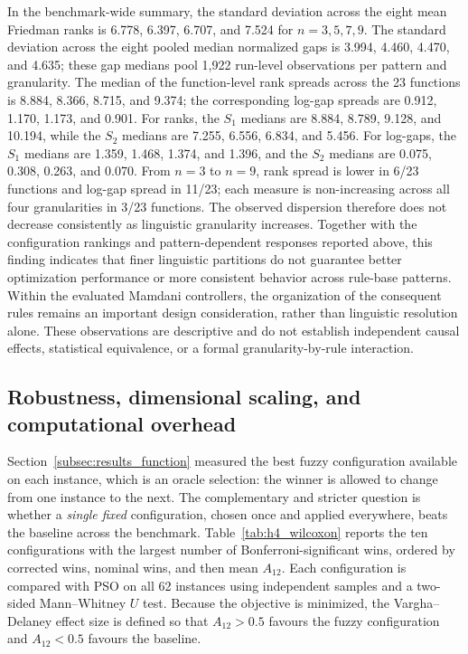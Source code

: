 In the benchmark-wide summary, the standard deviation across the eight mean Friedman ranks is 6.778, 6.397, 6.707, and 7.524 for $n=3,5,7,9$. The standard deviation across the eight pooled median normalized gaps is 3.994, 4.460, 4.470, and 4.635; these gap medians pool 1,922 run-level observations per pattern and granularity. The median of the function-level rank spreads across the 23 functions is 8.884, 8.366, 8.715, and 9.374; the corresponding log-gap spreads are 0.912, 1.170, 1.173, and 0.901. For ranks, the $S_1$ medians are 8.884, 8.789, 9.128, and 10.194, while the $S_2$ medians are 7.255, 6.556, 6.834, and 5.456. For log-gaps, the $S_1$ medians are 1.359, 1.468, 1.374, and 1.396, and the $S_2$ medians are 0.075, 0.308, 0.263, and 0.070. From $n=3$ to $n=9$, rank spread is lower in 6/23 functions and log-gap spread in 11/23; each measure is non-increasing across all four granularities in 3/23 functions. The observed dispersion therefore does not decrease consistently as linguistic granularity increases. Together with the configuration rankings and pattern-dependent responses reported above, this finding indicates that finer linguistic partitions do not guarantee better optimization performance or more consistent behavior across rule-base patterns. Within the evaluated Mamdani controllers, the organization of the consequent rules remains an important design consideration, rather than linguistic resolution alone. These observations are descriptive and do not establish independent causal effects, statistical equivalence, or a formal granularity-by-rule interaction.


\subsection{Robustness, dimensional scaling, and computational overhead}
\label{subsec:results_robustness}

Section~\ref{subsec:results_function} measured the best fuzzy configuration available on each instance, which is an oracle selection: the winner is allowed to change from one instance to the next. The complementary and stricter question is whether a \emph{single fixed} configuration, chosen once and applied everywhere, beats the baseline across the benchmark. Table~\ref{tab:h4_wilcoxon} reports the ten configurations with the largest number of Bonferroni-significant wins, ordered by corrected wins, nominal wins, and then mean $A_{12}$. Each configuration is compared with PSO on all 62 instances using independent samples and a two-sided Mann--Whitney $U$ test. Because the objective is minimized, the Vargha--Delaney effect size is defined so that $A_{12} > 0.5$ favours the fuzzy configuration and $A_{12} < 0.5$ favours the baseline.

